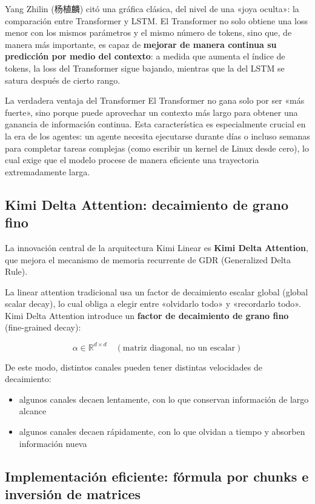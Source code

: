 \documentclass[a4paper]{article}
\begin{document}
Yang Zhilin (杨植麟) citó una gráfica clásica, del nivel de una «joya oculta»: la comparación entre Transformer y LSTM. El Transformer no solo obtiene una loss menor con los mismos parámetros y el mismo número de tokens, sino que, de manera más importante, es capaz de \textbf{mejorar de manera continua su predicción por medio del contexto}: a medida que aumenta el índice de tokens, la loss del Transformer sigue bajando, mientras que la del LSTM se satura después de cierto rango.

\begin{knowledgebox}{La verdadera ventaja del Transformer}
El Transformer no gana solo por ser «más fuerte», sino porque puede aprovechar un contexto más largo para obtener una ganancia de información continua. Esta característica es especialmente crucial en la era de los agentes: un agente necesita ejecutarse durante días o incluso semanas para completar tareas complejas (como escribir un kernel de Linux desde cero), lo cual exige que el modelo procese de manera eficiente una trayectoria extremadamente larga.
\end{knowledgebox}

\subsection{Kimi Delta Attention: decaimiento de grano fino}

La innovación central de la arquitectura Kimi Linear es \textbf{Kimi Delta Attention}, que mejora el mecanismo de memoria recurrente de GDR (Generalized Delta Rule).

La linear attention tradicional usa un factor de decaimiento escalar global (global scalar decay), lo cual obliga a elegir entre «olvidarlo todo» y «recordarlo todo». Kimi Delta Attention introduce un \textbf{factor de decaimiento de grano fino} (fine-grained decay):

$$\alpha \in \mathbb{R}^{d \times d} \quad (\text{matriz diagonal, no un escalar})$$

De este modo, distintos canales pueden tener distintas velocidades de decaimiento:
\begin{itemize}
    \item algunos canales decaen lentamente, con lo que conservan información de largo alcance
    \item algunos canales decaen rápidamente, con lo que olvidan a tiempo y absorben información nueva
\end{itemize}

\subsection{Implementación eficiente: fórmula por chunks e inversión de matrices}
\end{document}

